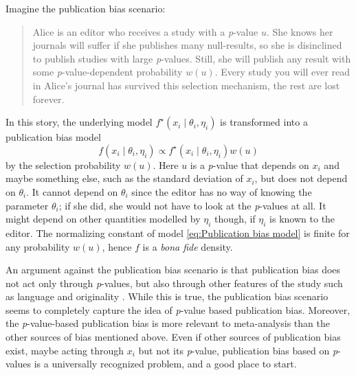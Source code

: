 \documentclass[useAMS,usenatbib,referee]{biom}
\begin{document}
Imagine the publication bias scenario:
\begin{quote}
Alice is an editor who receives a study with a \textit{p}-value $u$. She knows her journals will suffer if she publishes many null-results, so she is disinclined to publish studies with large \textit{p}-values. Still, she will publish any result with some \textit{p}-value-dependent probability $w(u)$. Every study you will ever read in Alice's journal has survived this selection mechanism, the rest are lost forever.
\end{quote}
In this story, the underlying model $f^{\star}(x_{i}\mid\theta_{i},\eta_{i})$
is transformed into a publication bias model \begin{equation}
f(x_{i}\mid\theta_{i},\eta_{i})\propto f^{\star}(x_{i}\mid\theta_{i},\eta_{i})w(u)\label{eq:Publication bias model}
\end{equation}
by the selection probability $w(u)$. Here $u$ is a \textit{p}-value that depends on $x_{i}$ and maybe something else, such as the standard deviation of $x_{i}$, but does not depend on $\theta_{i}$. It cannot depend on $\theta_{i}$ since the editor has no way of knowing the parameter $\theta_{i}$; if she did, she would not have to look at the \textit{p}-values at all. It might depend on other quantities modelled by $\eta_{i}$ though, if $\eta_{i}$ is known to the editor. The normalizing constant of model \eqref{eq:Publication bias model} is finite for any probability $w(u)$, hence $f$ is a \textit{bona fide} density.

An argument against the publication bias scenario is that publication bias does not act only through \textit{p}-values, but also through other features of the study such as language \citep{egger1998meta}
and originality \citep{callaham1998positive}. While this is true, the publication bias scenario seems to completely capture the idea of \textit{p}-value based publication bias. Moreover, the \textit{p}-value-based publication bias is more relevant to meta-analysis than the other sources of bias mentioned above. Even if other sources of publication bias exist, maybe acting through $x_{i}$ but not its \textit{p}-value, publication bias based on \textit{p}-values is a universally recognized problem, and a good place to start.
\end{document}
